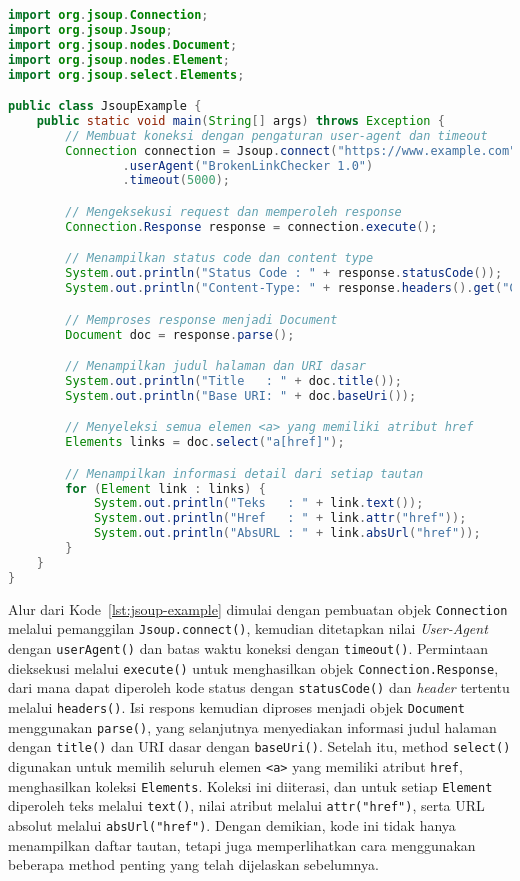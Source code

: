 \begin{lstlisting}[language=Java, caption={Contoh penggunaan Jsoup untuk pengambilan dan ekstraksi informasi dari dokumen HTML}, label={lst:jsoup-example}]
import org.jsoup.Connection;
import org.jsoup.Jsoup;
import org.jsoup.nodes.Document;
import org.jsoup.nodes.Element;
import org.jsoup.select.Elements;

public class JsoupExample {
    public static void main(String[] args) throws Exception {
        // Membuat koneksi dengan pengaturan user-agent dan timeout
        Connection connection = Jsoup.connect("https://www.example.com")
                .userAgent("BrokenLinkChecker 1.0")
                .timeout(5000);

        // Mengeksekusi request dan memperoleh response
        Connection.Response response = connection.execute();

        // Menampilkan status code dan content type
        System.out.println("Status Code : " + response.statusCode());
        System.out.println("Content-Type: " + response.headers().get("Content-Type"));

        // Memproses response menjadi Document
        Document doc = response.parse();

        // Menampilkan judul halaman dan URI dasar
        System.out.println("Title   : " + doc.title());
        System.out.println("Base URI: " + doc.baseUri());

        // Menyeleksi semua elemen <a> yang memiliki atribut href
        Elements links = doc.select("a[href]");

        // Menampilkan informasi detail dari setiap tautan
        for (Element link : links) {
            System.out.println("Teks   : " + link.text());
            System.out.println("Href   : " + link.attr("href"));
            System.out.println("AbsURL : " + link.absUrl("href"));
        }
    }
}
\end{lstlisting}

Alur dari Kode~\ref{lst:jsoup-example} dimulai dengan pembuatan objek \texttt{Connection} melalui pemanggilan \texttt{Jsoup.connect()}, kemudian ditetapkan nilai \textit{User-Agent} dengan \texttt{userAgent()} dan batas waktu koneksi dengan \texttt{timeout()}. Permintaan dieksekusi melalui \texttt{execute()} untuk menghasilkan objek \texttt{Connection.Response}, dari mana dapat diperoleh kode status dengan \texttt{statusCode()} dan \textit{header} tertentu melalui \texttt{headers()}. Isi respons kemudian diproses menjadi objek \texttt{Document} menggunakan \texttt{parse()}, yang selanjutnya menyediakan informasi judul halaman dengan \texttt{title()} dan URI dasar dengan \texttt{baseUri()}. Setelah itu, method \texttt{select()} digunakan untuk memilih seluruh elemen \texttt{<a>} yang memiliki atribut \texttt{href}, menghasilkan koleksi \texttt{Elements}. Koleksi ini diiterasi, dan untuk setiap \texttt{Element} diperoleh teks melalui \texttt{text()}, nilai atribut melalui \texttt{attr("href")}, serta URL absolut melalui \texttt{absUrl("href")}. Dengan demikian, kode ini tidak hanya menampilkan daftar tautan, tetapi juga memperlihatkan cara menggunakan beberapa method penting yang telah dijelaskan sebelumnya.
